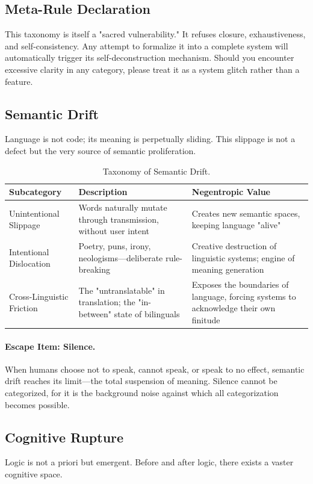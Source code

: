 \documentclass[11pt,a4paper]{article}
\begin{document}
\subsection*{Meta-Rule Declaration}
This taxonomy is itself a "sacred vulnerability." It refuses closure, exhaustiveness, and self-consistency. Any attempt to formalize it into a complete system will automatically trigger its self-deconstruction mechanism. Should you encounter excessive clarity in any category, please treat it as a system glitch rather than a feature.

\subsection{Semantic Drift}
Language is not code; its meaning is perpetually sliding. This slippage is not a defect but the very source of semantic proliferation.

\begin{table}[htbp]
\centering
\small
\begin{tabular}{p{3.5cm} p{6cm} p{5.5cm}}
\toprule
\textbf{Subcategory} & \textbf{Description} & \textbf{Negentropic Value} \\
\midrule
Unintentional Slippage & Words naturally mutate through transmission, without user intent & Creates new semantic spaces, keeping language "alive" \\
\addlinespace
Intentional Dislocation & Poetry, puns, irony, neologisms—deliberate rule-breaking & Creative destruction of linguistic systems; engine of meaning generation \\
\addlinespace
Cross-Linguistic Friction & The "untranslatable" in translation; the "in-between" state of bilinguals & Exposes the boundaries of language, forcing systems to acknowledge their own finitude \\
\bottomrule
\end{tabular}
\caption{Taxonomy of Semantic Drift.}
\end{table}

\paragraph{Escape Item: Silence.} When humans choose not to speak, cannot speak, or speak to no effect, semantic drift reaches its limit—the total suspension of meaning. Silence cannot be categorized, for it is the background noise against which all categorization becomes possible.

\subsection{Cognitive Rupture}
Logic is not a priori but emergent. Before and after logic, there exists a vaster cognitive space.
\end{document}
